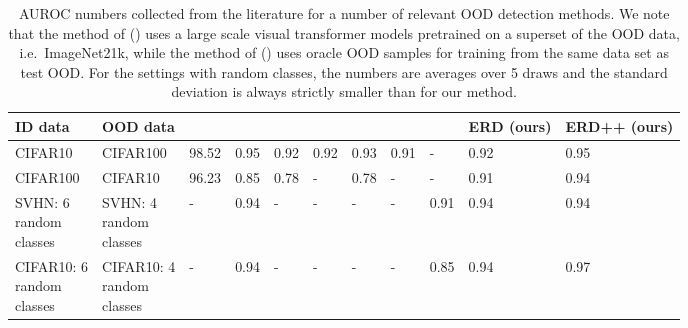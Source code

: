 \begin{table*}[h]
\tiny
\centering

\caption{AUROC numbers collected from the literature for a number of relevant
OOD detection methods. We note that the method of \citet{fort2021} () uses a large scale
visual transformer models pretrained on a superset of the OOD data, i.e.\
ImageNet21k, while the method of \citet{sehwag2021} () uses oracle OOD
samples for training from the same data set as test OOD. For the settings with random classes, the numbers are averages over 5
draws and the standard deviation is always strictly smaller than  for our
method.}
\label{table_cifar10_cifar100}

\begin{tabularx}{\textwidth} {@{}ll @{} @{\hskip 0.1cm} XXXXXXXXX @{}} 
  \toprule
ID data  & OOD data & \citet{fort2021} & \citet{openhybrid2020} &
\citet{winkens2020} & \citet{Tack2020} & \citet{sehwag2021} &\citet{liu2020hybrid} &
\citet{yujie2020} & ERD (ours) & ERD++ (ours)                   \\
\midrule

CIFAR10  & CIFAR100 & 98.52                             & 0.95          & 0.92
         & 0.92           &     0.93               & 0.91  & - & 0.92       & 0.95 \\
CIFAR100 & CIFAR10  & 96.23                             & 0.85
         & 0.78                                 & - & 0.78
         & - & -                                     & 0.91       & 0.94 \\
\midrule
\makecell[l]{SVHN: 6\\ random\\ classes} & \makecell[l]{SVHN: 4\\ random\\
classes}  & -                             & 0.94
          & -               & -                  & -
          & -                                & 0.91      & 0.94       & 0.94 \\
\makecell[l]{CIFAR10: 6\\ random\\ classes} & \makecell[l]{CIFAR10: 4\\ random\\
classes}  & -                             & 0.94
          & -                  & -               & -
          & -                                & 0.85      & 0.94       & 0.97 \\

  \bottomrule
\end{tabularx}
\vspace{0.5cm}

\end{table*}

